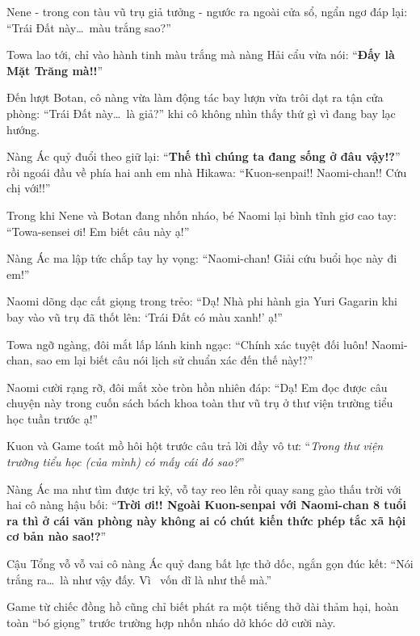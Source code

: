 \documentclass[../main.tex]{subfiles}
\begin{document}
Nene - trong con tàu vũ trụ giả tưởng - ngước ra ngoài cửa sổ, ngẩn ngơ đáp lại: ``Trái Đất này\dots\ màu trắng sao?''

Towa lao tới, chỉ vào hành tinh màu trắng mà nàng Hải cẩu vừa nói: ``\textbf{Đấy là Mặt Trăng mà!!}''


Đến lượt Botan, cô nàng vừa làm động tác bay lượn vừa trôi dạt ra tận cửa phòng: ``Trái Đất này\dots\ là giả?'' khi cô không nhìn thấy thứ gì vì đang bay lạc hướng.

Nàng Ác quỷ đuổi theo giữ lại: ``\textbf{Thế thì chúng ta đang sống ở đâu vậy!?}'' rồi ngoái đầu về phía hai anh em nhà Hikawa: ``Kuon-senpai!! Naomi-chan!! Cứu chị với!!''


Trong khi Nene và Botan đang nhốn nháo, bé Naomi lại bình tĩnh giơ cao tay: ``Towa-sensei ơi! Em biết câu này ạ!''

Nàng Ác ma lập tức chắp tay hy vọng: ``Naomi-chan! Giải cứu buổi học này đi em!''

Naomi dõng dạc cất giọng trong trẻo: ``Dạ! Nhà phi hành gia Yuri Gagarin khi bay vào vũ trụ đã thốt lên: `Trái Đất có màu xanh!' ạ!''

Towa ngỡ ngàng, đôi mắt lấp lánh kinh ngạc: ``Chính xác tuyệt đối luôn! Naomi-chan, sao em lại biết câu nói lịch sử chuẩn xác đến thế này!?''

Naomi cười rạng rỡ, đôi mắt xòe tròn hồn nhiên đáp: ``Dạ! Em đọc được câu chuyện này trong cuốn sách bách khoa toàn thư vũ trụ ở thư viện trường tiểu học tuần trước ạ!''

Kuon và Game toát mồ hôi hột trước câu trả lời đầy vô tư: ``\textit{Trong thư viện trường tiểu học (của mình) có mấy cái đó sao?}''

Nàng Ác ma như tìm được tri kỷ, vỗ tay reo lên rồi quay sang gào thấu trời với hai cô nàng hậu bối: ``\textbf{Trời ơi!! Ngoài Kuon-senpai với Naomi-chan 8 tuổi ra thì ở cái văn phòng này không ai có chút kiến thức phép tắc xã hội cơ bản nào sao!?}''

Cậu Tổng vỗ vỗ vai cô nàng Ác quỷ đang bất lực thở dốc, ngắn gọn đúc kết: ``Nói trắng ra\dots\ là như vậy đấy. Vì \hll\ vốn dĩ là như thế mà.''

Game từ chiếc đồng hồ cũng chỉ biết phát ra một tiếng thở dài thảm hại, hoàn toàn ``bó giọng'' trước trường hợp nhốn nháo dở khóc dở cười này.

\end{document}
